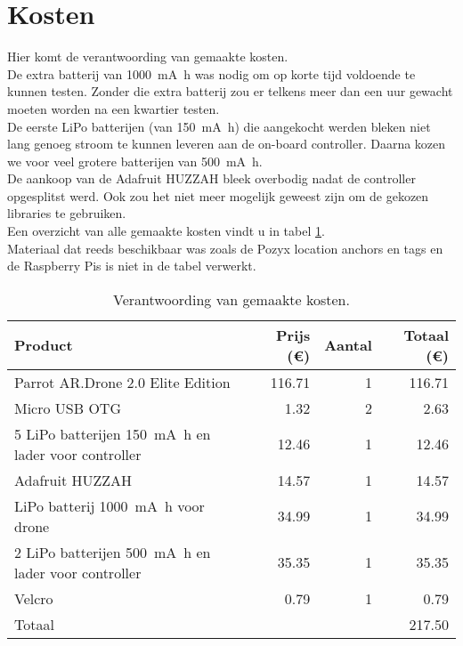 \section{Kosten}
Hier komt de verantwoording van gemaakte kosten.\\
De extra batterij van \SI{1000}{\mA\hour} was nodig om op korte tijd voldoende te kunnen testen. Zonder die extra batterij zou er telkens meer dan een uur gewacht moeten worden na een kwartier testen.\\
De eerste LiPo batterijen (van \SI{150}{\mA\hour}) die aangekocht werden bleken niet lang genoeg stroom te kunnen leveren aan de on-board controller. Daarna kozen we voor veel grotere batterijen van \SI{500}{\mA\hour}.\\
De aankoop van de Adafruit HUZZAH bleek overbodig nadat de controller opgesplitst werd. Ook zou het niet meer mogelijk geweest zijn om de gekozen libraries te gebruiken.\\

Een overzicht van alle gemaakte kosten vindt u in tabel \ref{tab:kosten}.\\
Materiaal dat reeds beschikbaar was zoals de Pozyx location anchors en tags en de Raspberry Pis is niet in de tabel verwerkt.
\begin{table}[p]
\centering
\begin{tabular}{ |l|r|r|r| } \hline
Product & Prijs (\euro{}) & Aantal & Totaal (\euro{}) \\ [.5ex] \hline \hline
Parrot AR.Drone 2.0 Elite Edition & 116.71 & 1 & 116.71 \\ \hline
Micro USB OTG & 1.32 & 2 & 2.63 \\ \hline
5 LiPo batterijen \SI{150}{\mA\hour} en lader voor controller & 12.46 & 1 & 12.46 \\ \hline
Adafruit HUZZAH & 14.57 & 1 & 14.57 \\ \hline
LiPo batterij \SI{1000}{\mA\hour} voor drone & 34.99 & 1 & 34.99 \\ \hline
2 LiPo batterijen \SI{500}{\mA\hour} en lader voor controller & 35.35 & 1 & 35.35 \\ [.5ex] \hline
Velcro & 0.79 & 1 & 0.79 \\ \hline
\hline
Totaal & & & 217.50 \\ \hline
\end{tabular}
\caption[Kosten]{Verantwoording van gemaakte kosten.}
\label{tab:kosten}
\end{table}